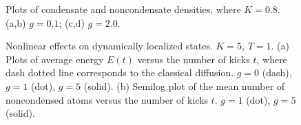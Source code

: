 \documentclass[twocolumn,prl,aps,showpacs]{revtex4}
\begin{document}
\begin{figure}[!t]
\vspace*{-0.5cm}

\begin{center}
\end{center}
\vspace*{-0.5cm}

\caption{Plots of condensate and noncondensate densities, where $K=0.8$. (a,b) $g=0.1$; (c,d) $g=2.0$. }
\label{fig:wave}
\end{figure}

\begin{figure}[!b]
\vspace*{-0.5cm}

\begin{center}
\end{center}
\vspace*{-0.8cm}

\caption{Nonlinear effects on dynamically localized states. $K=5$, $T=1$. (a) Plots of average energy $E(t)$ versus the number of kicks $t$, where
dash dotted line corresponds to the classical diffusion. $g=0$ (dash), $g=1$ (dot), $g=5$ (solid). 
(b) Semilog plot of the mean number of noncondensed atoms versus the number of kicks $t$. $g=1$ (dot),
$g=5$ (solid).}
\label{fig:dl}
\end{figure}
\end{document}
